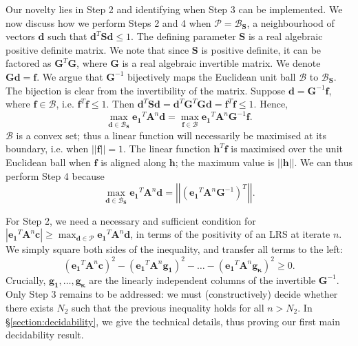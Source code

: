 Our novelty lies in Step 2 and identifying when Step 3 can be implemented. We now discuss how we perform Steps 2 and 4 when $\mathcal{P} = \mathcal{B}_\mathbf{S}$, a neighbourhood of vectors $\mathbf{d}$ such that $\mathbf{d}^T\mathbf{S}\mathbf{d} \le 1$. The defining parameter $\mathbf{S}$ is a real algebraic positive definite matrix. We note that since $\mathbf{S}$ is positive definite, it can be factored as $\mathbf{G}^T\mathbf{G}$, where $\mathbf{G}$ is a real algebraic invertible matrix. We denote $\mathbf{Gd} = \mathbf{f}$. We argue that $\mathbf{G}^{-1}$ bijectively maps the Euclidean unit ball $\mathcal{B}$ to $\mathcal{B}_\mathbf{S}$. The bijection is clear from the invertibility of the matrix. Suppose $\mathbf{d} = \mathbf{G}^{-1}\mathbf{f}$, where $\mathbf{f} \in \mathcal{B}$, i.e. $\mathbf{f}^T\mathbf{f} \le 1$. Then $\mathbf{d}^T\mathbf{Sd} = \mathbf{d}^T\mathbf{G}^T\mathbf{Gd} = \mathbf{f}^T\mathbf{f} \le 1.$
Hence,
\begin{equation}
\max_{\mathbf{d} \in \mathcal{B}_\mathbf{S}} \mathbf{e_1}^T\mathbf{A}^n\mathbf{d} = \max_{\mathbf{f} \in \mathcal{B}} \mathbf{e_1}^T\mathbf{A}^n\mathbf{G}^{-1}\mathbf{f}.
\end{equation}
$\mathcal{B}$ is a convex set; thus a linear function will necessarily be maximised at its boundary, i.e. when $||\mathbf{f}|| = 1$. The linear function $\mathbf{h}^T\mathbf{f}$ is maximised over the unit Euclidean ball when $\mathbf{f}$ is aligned along $\mathbf{h}$; the maximum value is $||\mathbf{h}||$. We can thus perform Step 4 because
\begin{equation}
\max_{\mathbf{d} \in \mathcal{B}_\mathbf{S}} \mathbf{e_1}^T\mathbf{A}^n\mathbf{d} = \left|\left|\left( \mathbf{e_1}^T\mathbf{A}^n\mathbf{G}^{-1} \right)^T\right|\right|.
\end{equation}

For Step 2, we need a necessary and sufficient condition for $|\mathbf{e_1}^T \mathbf{A}^n \mathbf{c}|\ge \max_{\mathbf{d} \in \mathcal{P}} \mathbf{e_1}^T\mathbf{A}^n\mathbf{d}$, in terms of the positivity of an LRS at iterate $n$. We simply square both sides of the inequality, and transfer all terms to the left: 
\begin{equation}
\label{eq:critical}
(\mathbf{e_1}^T \mathbf{A}^n \mathbf{c})^2 - (\mathbf{e_1}^T \mathbf{A}^n \mathbf{g_1})^2 - \dots - (\mathbf{e_1}^T \mathbf{A}^n \mathbf{g_\kappa})^2 \ge 0.
\end{equation}
Crucially, $\mathbf{g_1}, \dots, \mathbf{g_\kappa}$ are the linearly independent columns of the invertible $\mathbf{G}^{-1}$. Only Step 3 remains to be addressed: we must (constructively) decide whether there exists $N_2$ such that the previous inequality holds for all $n > N_2$. In \S\ref{section:decidability}, we give the technical details, thus proving our first main decidability result.

